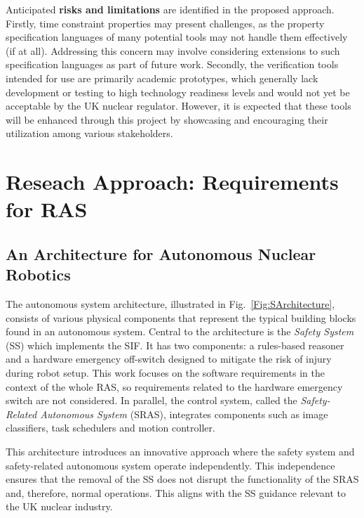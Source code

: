 \documentclass[conference]{IEEEtran}
\newcommand{\louisenote}[1]{\todo[color=green!65]{Louise: #1}}
\begin{document}
Anticipated \textbf{risks and limitations} are identified in the proposed approach. Firstly, time constraint properties may present challenges, as the property specification languages of many potential tools may not handle them effectively (if at all). Addressing this concern may involve considering extensions to such specification languages as part of future work. Secondly, the verification tools intended for use are primarily academic prototypes, which generally lack development or testing to high technology readiness levels and would not yet be acceptable by the UK nuclear regulator. However, it is expected that these tools will be enhanced through this project by showcasing and encouraging their utilization among various stakeholders. %


\section{Reseach Approach: Requirements for RAS}
\subsection{An Architecture for Autonomous Nuclear Robotics}
\label{sec:research_approach} 
The autonomous system architecture, illustrated in Fig.~\ref{Fig:SArchitecture}, consists of various physical components that represent the typical building blocks found in an autonomous system. Central to the architecture is the \textit{Safety System} (SS) which implements the SIF. It has two components: a rules-based reasoner and a hardware emergency off-switch designed to mitigate the risk of injury during robot setup. This work focuses on the software requirements in the context of the whole RAS, so requirements related to the hardware emergency switch are not considered. In parallel, the control system, called the \textit{Safety-Related Autonomous System} (SRAS), integrates components such as image classifiers, task schedulers and motion controller.

This architecture introduces an innovative approach where the safety system and safety-related autonomous system operate independently\cite{Louise&Chris}. This independence ensures that the removal of the SS does not disrupt the functionality of the SRAS and, therefore, normal operations. This aligns with the SS guidance relevant to the UK nuclear industry. 
\end{document}
